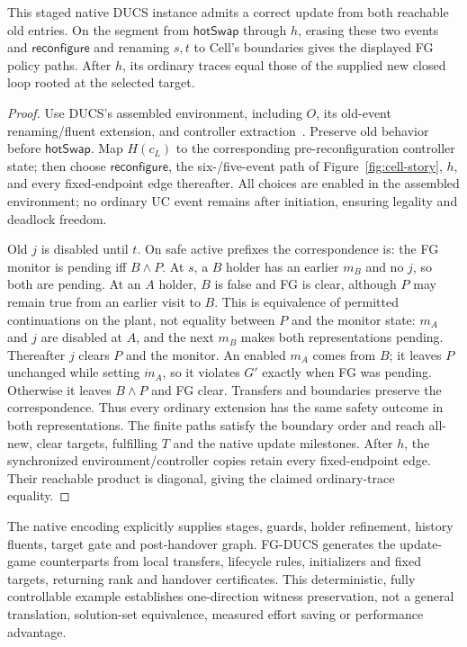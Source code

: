 \begin{proposition}
\label{prop:cell-ducs-complete}
This staged native DUCS instance admits a correct update from both reachable old entries. On the segment from $\mathsf{hotSwap}$ through $h$, erasing these two events and $\mathsf{reconfigure}$ and renaming $s,t$ to Cell's boundaries gives the displayed FG policy paths. After $h$, its ordinary traces equal those of the supplied new closed loop rooted at the selected target.
\end{proposition}
\begin{proof}
Use DUCS's assembled environment, including $O$, its old-event renaming/fluent extension, and controller extraction~\cite[Sec.~5, Theorem~5.1]{Nahabedian2020}. Preserve old behavior before $\mathsf{hotSwap}$. Map $H(c_L)$ to the corresponding pre-reconfiguration controller state; then choose $\mathsf{reconfigure}$, the six-/five-event path of Figure~\ref{fig:cell-story}, $h$, and every fixed-endpoint edge thereafter. All choices are enabled in the assembled environment; no ordinary UC event remains after initiation, ensuring legality and deadlock freedom.

Old $j$ is disabled until $t$. On safe active prefixes the correspondence is: the FG monitor is pending iff $B\land P$. At $s$, a $B$ holder has an earlier $m_B$ and no $j$, so both are pending. At an $A$ holder, $B$ is false and FG is clear, although $P$ may remain true from an earlier visit to $B$. This is equivalence of permitted continuations on the plant, not equality between $P$ and the monitor state: $m_A$ and $j$ are disabled at $A$, and the next $m_B$ makes both representations pending. Thereafter $j$ clears $P$ and the monitor. An enabled $m_A$ comes from $B$; it leaves $P$ unchanged while setting $\dot m_A$, so it violates $G'$ exactly when FG was pending. Otherwise it leaves $B\land P$ and FG clear. Transfers and boundaries preserve the correspondence. Thus every ordinary extension has the same safety outcome in both representations. The finite paths satisfy the boundary order and reach all-new, clear targets, fulfilling $T$ and the native update milestones. After $h$, the synchronized environment/controller copies retain every fixed-endpoint edge. Their reachable product is diagonal, giving the claimed ordinary-trace equality.
\end{proof}

The native encoding explicitly supplies stages, guards, holder refinement, history fluents, target gate and post-handover graph. FG-DUCS generates the update-game counterparts from local transfers, lifecycle rules, initializers and fixed targets, returning rank and handover certificates. This deterministic, fully controllable example establishes one-direction witness preservation, not a general translation, solution-set equivalence, measured effort saving or performance advantage.

